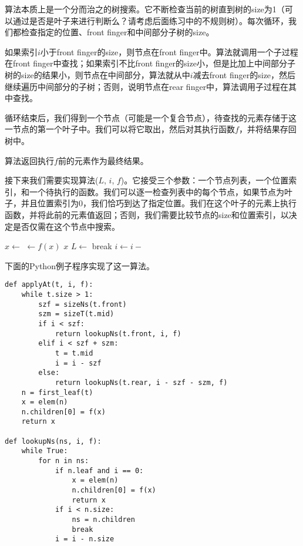 \documentclass[UTF8]{article}
\begin{document}
算法本质上是一个分而治之的树搜索。它不断检查当前的树直到树的size为1（可以通过是否是叶子来进行判断么？请考虑后面练习中的不规则树）。每次循环，我们都检查指定的位置、front finger和中间部分子树的size。

如果索引$i$小于front finger的size，则节点在front finger中。算法就调用一个子过程在front finger中查找；如果索引不比front finger的size小，但是比加上中间部分子树的size的结果小，则节点在中间部分，算法就从中$i$减去front finger的size，然后继续遍历中间部分的子树；否则，说明节点在rear finger中，算法调用子过程在其中查找。

循环结束后，我们得到一个节点（可能是一个复合节点），待查找的元素存储于这一节点的第一个叶子中。我们可以将它取出，然后对其执行函数$f$，并将结果存回树中。

算法返回执行$f$前的元素作为最终结果。

接下来我们需要实现算法($L$, $i$, $f$)。它接受三个参数：一个节点列表，一个位置索引，和一个待执行的函数。我们可以逐一检查列表中的每个节点，如果节点为叶子，并且位置索引为0，我们恰巧到达了指定位置。我们在这个叶子的元素上执行函数，并将此前的元素值返回；否则，我们需要比较节点的size和位置索引，以决定是否仅需在这个节点中搜索。

\begin{algorithmic}
  \Loop
        \State $x \gets $ 
        \State {} $\gets f(x)$
        \State \Return $x$
      \EndIf
        \State $L \gets $ 
        \State break
      \EndIf
      \State $i \gets i - $ 
    \EndFor
  \EndLoop
\EndFunction
\end{algorithmic}

下面的Python例子程序实现了这一算法。

\lstset{language=Python}
\begin{lstlisting}
def applyAt(t, i, f):
    while t.size > 1:
        szf = sizeNs(t.front)
        szm = sizeT(t.mid)
        if i < szf:
            return lookupNs(t.front, i, f)
        elif i < szf + szm:
            t = t.mid
            i = i - szf
        else:
            return lookupNs(t.rear, i - szf - szm, f)
    n = first_leaf(t)
    x = elem(n)
    n.children[0] = f(x)
    return x

def lookupNs(ns, i, f):
    while True:
        for n in ns:
            if n.leaf and i == 0:
                x = elem(n)
                n.children[0] = f(x)
                return x
            if i < n.size:
                ns = n.children
                break
            i = i - n.size
\end{lstlisting}
\end{document}
